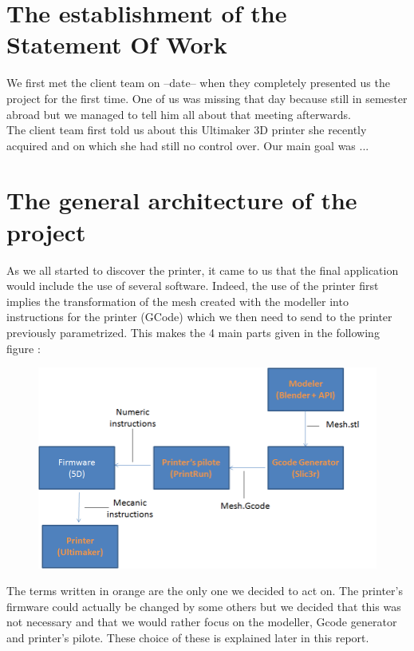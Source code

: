 \documentclass{report}
\begin{document}
\section{The establishment of the Statement Of Work}

We first met the client team on --date-- when they completely presented us the project for the first time. One of us was missing that day because still in semester abroad but we managed to tell him all about that meeting afterwards. \\

The client team first told us about this Ultimaker 3D printer she recently acquired and on which she had still no control over. Our main goal was ...

\section{The general architecture of the project}

As we all started to discover the printer, it came to us that the final application would include the use of several software. Indeed, the use of the printer first implies the transformation of the mesh created with the modeller into instructions for the printer (GCode) which we then need to send to the printer previously parametrized. This makes the 4 main parts given in the following figure :

\begin{figure}[!h]
\begin{center}
	\includegraphics[scale=0.4]{ARD1}
\end{center}
\end{figure}

The terms written in orange are the only one we decided to act on. The printer's firmware could actually be changed by some others but we decided that this was not necessary and that we would rather focus on the modeller, Gcode generator and printer's pilote. These choice of these is explained later in this report. 
\end{document}

